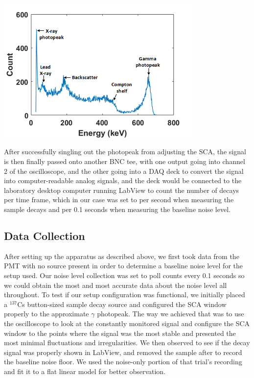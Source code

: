 \documentclass[10pt,letterpaper,onecolumn]{article}
\begin{document}
 \begin{center}
 \includegraphics*[width=4in]{Cs137 Spectrum.png}
 \label{fig:spectrum}
 \end{center}


After successfully singling out the photopeak from adjusting the SCA, the signal is then finally passed onto another BNC tee, with one output going into channel 2 of the oscilloscope, and the other going into a DAQ deck to convert the signal into computer-readable analog signals, and the deck would be connected to the laboratory desktop computer running LabView to count the number of decays per time frame, which in our case was set to per second when measuring the sample decays and per 0.1 seconds when measuring the baseline noise level.




\subsection{Data Collection}

After setting up the apparatus as described above, we first took data from the PMT with no source present in order to determine a baseline noise level for the setup used. Our noise level collection was set to poll counts every 0.1 seconds so we could obtain the most and most accurate data about the noise level all throughout. To test if our setup configuration was functional, we initially placed a $^{137}$Cs button-sized sample decay source and configured the SCA window properly to the approximate $\gamma$ photopeak. The way we achieved that was to use the oscilloscope to look at the constantly monitored signal and configure the SCA window to the points where the signal was the most stable and presented the most minimal fluctuations and irregularities. We then observed to see if the decay signal was properly shown in LabView, and removed the sample after to record the baseline noise floor. We used the noise-only portion of that trial's recording and fit it to a flat linear model for better observation. \\
\end{document}
